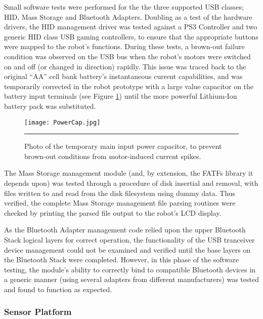 Small software tests were performed for the the three supported USB classes; HID, Mass Storage and Bluetooth Adapters. Doubling as a test of the hardware drivers, the HID management driver was tested against a PS3 Controller and two generic HID class USB gaming controllers, to ensure that the appropriate buttons were mapped to the robot's functions. During these tests, a brown-out failure condition was observed on the USB bus when the robot's motors were switched on and off (or changed in direction) rapidly. This issue was traced back to the original ``AA'' cell bank battery's instantaneous current capabilities, and was temporarily corrected in the robot prototype with a large value capacitor on the battery input terminals (see Figure \ref{fig:mainpowercap}) until the more powerful Lithium-Ion battery pack was substituted.

\begin{figure}[tbph]
	\vspace{1em}
	\centering
		\texttt{[image: PowerCap.jpg]}
	\rule{35em}{0.5pt}
	\caption[Temporary Main Power Input Capacitor]{Photo of the temporary main input power capacitor, to prevent brown-out conditions from motor-induced current spikes.}
	\label{fig:mainpowercap}
\end{figure}

The Mass Storage management module (and, by extension, the FATFs library it depends upon) was tested through a procedure of disk insertial and removal, with files written to and read from the disk filesystem using dummy data. Thus verified, the complete Mass Storage management file parsing routines were checked by printing the parsed file output to the robot's LCD display.

As the Bluetooth Adapter management code relied upon the upper Bluetooth Stack logical layers for correct operation, the functionality of the USB tranceiver device management could not be examined and verified until the base layers on the Bluetooth Stack were completed. However, in this phase of the software testing, the module's ability to correctly bind to compatible Bluetooth devices in a generic manner (using several adapters from different manufacturers) was tested and found to function as expected.

\FloatBarrier
\subsubsection{Sensor Platform}


